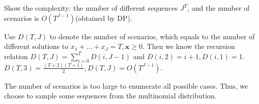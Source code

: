 










Show the complexity: the number of different sequences $J^{T}$, and the number of scenarios is $O(T^{J-1})$(obtained by DP).

Use $D(T,J) $ to denote the number of scenarios, which equals to the number of different solutions to $x_{1}+\ldots + x_{J} = T, \mathbf{x} \geq 0$.
Then we know the recursion relation $D(T, J) = \sum_{i= 0}^{T} D(i, J-1)$ and $D(i,2) = i+1, D(i,1) = 1$.
$D(T,3) = \frac{(T+2)(T+1)}{2}, D(T,J) = O(T^{J-1})$.

The number of scenarios is too large to enumerate all possible cases.
Thus, we choose to sample some sequences from the multinomial distribution.

